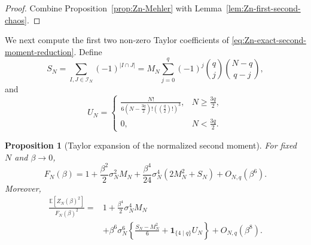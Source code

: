 \documentclass[11pt]{article}
\newtheorem{proposition}[theorem]{Proposition}
\newcommand{\E}{\mathbb{E}}
\newcommand{\calI}{\mathcal{I}}
\newcommand{\ind}{\mathbf{1}}
\begin{document}
\begin{proof}
  Combine Proposition~\ref{prop:Zn-Mehler} with
  Lemma~\ref{lem:Zn-first-second-chaos}.
\end{proof}

We next compute the first two non-zero Taylor coefficients of
\eqref{eq:Zn-exact-second-moment-reduction}.  Define
\begin{equation}\label{eq:Sn-sign-sum}
  S_N
  =
  \sum_{I,J\in\calI_N}(-1)^{|I\cap J|}
  =
  M_N
  \sum_{j=0}^q
    (-1)^j
    \binom qj
    \binom{N-q}{q-j},
\end{equation}
and
\begin{equation}\label{eq:Un-triples}
  U_N
  =
  \begin{cases}
    \displaystyle
    \frac{N!}{
      6\left(N-\frac{3q}{2}\right)!
      \left(\left(\frac q2\right)!\right)^3
    },
    & N\geq\frac{3q}{2},
    \\
    0,
    & N<\frac{3q}{2}.
  \end{cases}
\end{equation}

\begin{proposition}[Taylor expansion of the normalized second moment]
  \label{prop:Zn2-Taylor-expansion}
  For fixed $N$ and $\beta\to0$,
  \begin{equation}\label{eq:Fn-Taylor-expansion}
    F_N(\beta)
    =
    1
    +
    \frac{\beta^2}{2}\sigma_N^2M_N
    +
    \frac{\beta^4}{24}\sigma_N^4
    \left(
      2M_N^2+S_N
    \right)
    +
    O_{N,q}(\beta^6).
  \end{equation}
  Moreover,
  \begin{equation}\label{eq:Zn2-ratio-Taylor-expansion}
    \begin{aligned}
      \frac{\E[Z_N(\beta)^2]}{F_N(\beta)^2}
      ={}&
      1
      +
      \frac{\beta^4}{2}\sigma_N^4M_N
      \\
      &+
      \beta^6\sigma_N^6
      \left\{
        \frac{S_N-M_N^2}{6}
        +
        \ind_{\{4\mid q\}}U_N
      \right\}
      +
      O_{N,q}(\beta^8).
    \end{aligned}
  \end{equation}
\end{proposition}
\end{document}
